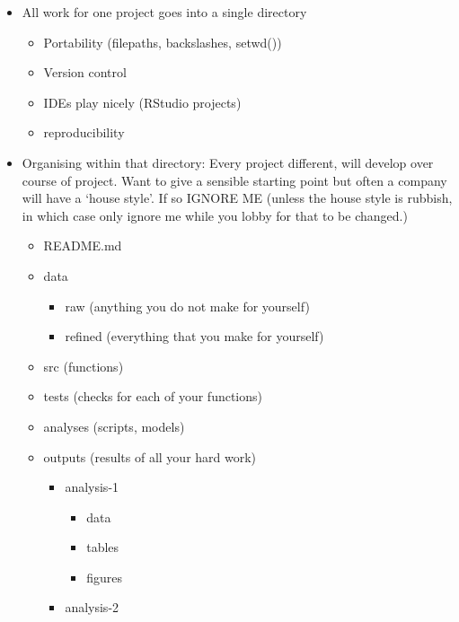 \documentclass[
  12pt,
]{book}
\providecommand{\tightlist}{%
  \setlength{\itemsep}{0pt}\setlength{\parskip}{0pt}}
\theoremstyle{definition}
\theoremstyle{definition}
\theoremstyle{definition}
\theoremstyle{definition}
\theoremstyle{remark}
\begin{document}
\begin{itemize}
\tightlist
\item
  All work for one project goes into a single directory

  \begin{itemize}
  \tightlist
  \item
    Portability (filepaths, backslashes, setwd())
  \item
    Version control
  \item
    IDEs play nicely (RStudio projects)
  \item
    reproducibility
  \end{itemize}
\item
  Organising within that directory: Every project different, will develop over course of project. Want to give a sensible starting point but often a company will have a `house style'. If so IGNORE ME (unless the house style is rubbish, in which case only ignore me while you lobby for that to be changed.)

  \begin{itemize}
  \tightlist
  \item
    README.md
  \item
    data

    \begin{itemize}
    \tightlist
    \item
      raw (anything you do not make for yourself)
    \item
      refined (everything that you make for yourself)
    \end{itemize}
  \item
    src (functions)
  \item
    tests (checks for each of your functions)
  \item
    analyses (scripts, models)
  \item
    outputs (results of all your hard work)

    \begin{itemize}
    \tightlist
    \item
      analysis-1

      \begin{itemize}
      \tightlist
      \item
        data
      \item
        tables
      \item
        figures
      \end{itemize}
    \item
      analysis-2


\end{itemize}
\end{itemize}
\end{itemize}
\end{document}
